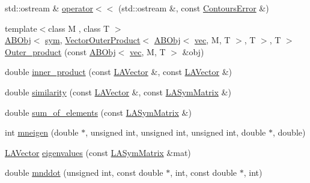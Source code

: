 \begin{DoxyCompactItemize}
\item 
std\+::ostream \& \mbox{\hyperlink{namespaceROOT_1_1Minuit2_a5f32b6f73f8b284fbc74fbf211a7b4ac}{operator$<$$<$}} (std\+::ostream \&, const \mbox{\hyperlink{classROOT_1_1Minuit2_1_1ContoursError}{Contours\+Error}} \&)
\item 
{\footnotesize template$<$class M , class T $>$ }\\\mbox{\hyperlink{classROOT_1_1Minuit2_1_1ABObj}{A\+B\+Obj}}$<$ \mbox{\hyperlink{classROOT_1_1Minuit2_1_1sym}{sym}}, \mbox{\hyperlink{classROOT_1_1Minuit2_1_1VectorOuterProduct}{Vector\+Outer\+Product}}$<$ \mbox{\hyperlink{classROOT_1_1Minuit2_1_1ABObj}{A\+B\+Obj}}$<$ \mbox{\hyperlink{classROOT_1_1Minuit2_1_1vec}{vec}}, M, T $>$, T $>$, T $>$ \mbox{\hyperlink{namespaceROOT_1_1Minuit2_af2403945113672e7581188addb96ff15}{Outer\+\_\+product}} (const \mbox{\hyperlink{classROOT_1_1Minuit2_1_1ABObj}{A\+B\+Obj}}$<$ \mbox{\hyperlink{classROOT_1_1Minuit2_1_1vec}{vec}}, M, T $>$ \&obj)
\item 
double \mbox{\hyperlink{namespaceROOT_1_1Minuit2_ac47f2faa5fce723ec08365b174b5035d}{inner\+\_\+product}} (const \mbox{\hyperlink{classROOT_1_1Minuit2_1_1LAVector}{L\+A\+Vector}} \&, const \mbox{\hyperlink{classROOT_1_1Minuit2_1_1LAVector}{L\+A\+Vector}} \&)
\item 
double \mbox{\hyperlink{namespaceROOT_1_1Minuit2_aa54e0f1ba5ca00da1b32710322034fee}{similarity}} (const \mbox{\hyperlink{classROOT_1_1Minuit2_1_1LAVector}{L\+A\+Vector}} \&, const \mbox{\hyperlink{classROOT_1_1Minuit2_1_1LASymMatrix}{L\+A\+Sym\+Matrix}} \&)
\item 
double \mbox{\hyperlink{namespaceROOT_1_1Minuit2_a9beed1d87603a5fd4c04f65e1f7b7cf7}{sum\+\_\+of\+\_\+elements}} (const \mbox{\hyperlink{classROOT_1_1Minuit2_1_1LASymMatrix}{L\+A\+Sym\+Matrix}} \&)
\item 
int \mbox{\hyperlink{namespaceROOT_1_1Minuit2_a4a6b91c57b107c48f582569401bb12e9}{mneigen}} (double $\ast$, unsigned int, unsigned int, unsigned int, double $\ast$, double)
\item 
\mbox{\hyperlink{classROOT_1_1Minuit2_1_1LAVector}{L\+A\+Vector}} \mbox{\hyperlink{namespaceROOT_1_1Minuit2_a1569bf99d4c46944433c0b5bb02b3ad6}{eigenvalues}} (const \mbox{\hyperlink{classROOT_1_1Minuit2_1_1LASymMatrix}{L\+A\+Sym\+Matrix}} \&mat)
\item 
double \mbox{\hyperlink{namespaceROOT_1_1Minuit2_a2226faf256d69bf5b922caad1380c34e}{mnddot}} (unsigned int, const double $\ast$, int, const double $\ast$, int)
\item 

\end{DoxyCompactItemize}
